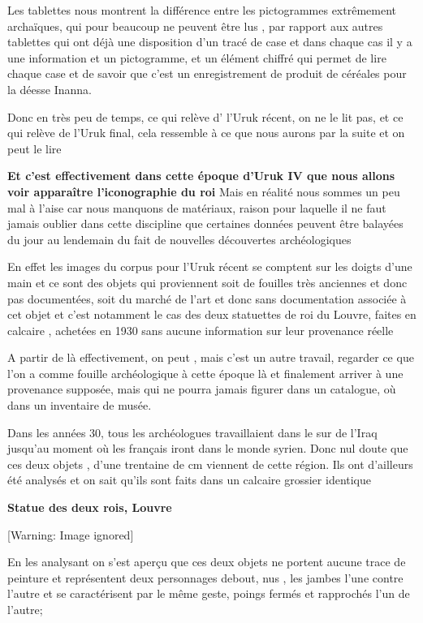 \documentclass[a4paper,10pt]{article}
\begin{document}
Les tablettes nous montrent la différence entre les pictogrammes
extrêmement archaïques, qui pour beaucoup ne peuvent être lus , par
rapport aux autres tablettes qui ont déjà une disposition
d'un tracé de case et dans chaque cas il y a une
information et un pictogramme,  et un élément chiffré qui  permet de
lire chaque case et de savoir que c'est un
enregistrement de produit de céréales pour la déesse Inanna.

Donc en très peu de temps, ce qui relève d'
l'Uruk récent, on ne le lit pas, et ce qui relève de
l'Uruk final, cela ressemble à ce que nous aurons par
la suite et on peut le lire

\textbf{Et c'est effectivement dans cette époque
d'Uruk IV que nous allons voir apparaître
l'iconographie du roi} Mais en réalité nous sommes un
peu mal à l'aise car nous manquons de matériaux,
raison pour laquelle il ne faut jamais oublier dans cette discipline
que certaines données peuvent être balayées du jour au lendemain du
fait de nouvelles découvertes archéologiques

En effet les images du corpus pour l'Uruk récent se
comptent sur les doigts d'une main et ce sont des
objets qui proviennent soit de fouilles très anciennes et donc pas
documentées, soit du marché de l'art et donc sans
documentation associée à cet objet et c'est notamment
le cas des deux statuettes de roi du Louvre, faites en calcaire ,
achetées en 1930 sans aucune information sur leur provenance réelle

A partir de là effectivement, on peut , mais c'est un
autre travail, regarder ce que l'on a comme fouille
archéologique à cette époque là et finalement arriver à une provenance
supposée, mais qui ne pourra jamais figurer dans un catalogue, où dans
un inventaire de musée.

Dans les années 30, tous les archéologues travaillaient dans le sur de
l'Iraq jusqu'au moment où les
français iront dans le monde syrien. Donc nul doute que ces deux objets
, d'une trentaine de cm viennent de cette région. Ils
ont d'ailleurs été analysés et on sait
qu'ils sont faits dans un calcaire grossier identique

\textbf{Statue des deux rois, Louvre}

  [Warning: Image ignored] %
 

En les analysant on s'est aperçu que ces deux objets ne
portent aucune trace de peinture et représentent deux personnages
debout, nus , les jambes l'une contre
l'autre et se caractérisent par le même geste,  poings
fermés et rapprochés l'un de l'autre;
\end{document}
